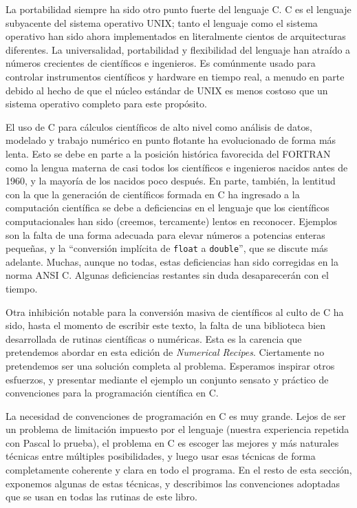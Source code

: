 \documentclass[10pt,a4paper]{book}
\begin{document}
\medskip

La portabilidad siempre ha sido otro punto fuerte del lenguaje C. C es el lenguaje subyacente del sistema operativo UNIX; tanto el lenguaje como el sistema operativo han sido ahora implementados en literalmente cientos de arquitecturas diferentes. La universalidad, portabilidad y flexibilidad del lenguaje han atraído a números crecientes de científicos e ingenieros. Es comúnmente usado para controlar instrumentos científicos y hardware en tiempo real, a menudo en parte debido al hecho de que el núcleo estándar de UNIX es menos costoso que un sistema operativo completo para este propósito.

\medskip

El uso de C para cálculos científicos de alto nivel como análisis de datos, modelado y trabajo numérico en punto flotante ha evolucionado de forma más lenta. Esto se debe en parte a la posición histórica favorecida del FORTRAN como la lengua materna de casi todos los científicos e ingenieros nacidos antes de 1960, y la mayoría de los nacidos poco después. En parte, también, la lentitud con la que la generación de científicos formada en C ha ingresado a la computación científica se debe a deficiencias en el lenguaje que los científicos computacionales han sido (creemos, tercamente) lentos en reconocer. Ejemplos son la falta de una forma adecuada para elevar números a potencias enteras pequeñas, y la “conversión implícita de \texttt{float} a \texttt{double}”, que se discute más adelante. Muchas, aunque no todas, estas deficiencias han sido corregidas en la norma ANSI C. Algunas deficiencias restantes sin duda desaparecerán con el tiempo.

\medskip

Otra inhibición notable para la conversión masiva de científicos al culto de C ha sido, hasta el momento de escribir este texto, la falta de una biblioteca bien desarrollada de rutinas científicas o numéricas. Esta es la carencia que pretendemos abordar en esta edición de \textit{Numerical Recipes}. Ciertamente no pretendemos ser una solución completa al problema. Esperamos inspirar otros esfuerzos, y presentar mediante el ejemplo un conjunto sensato y práctico de convenciones para la programación científica en C.

\medskip

La necesidad de convenciones de programación en C es muy grande. Lejos de ser un problema de limitación impuesto por el lenguaje (nuestra experiencia repetida con Pascal lo prueba), el problema en C es escoger las mejores y más naturales técnicas entre múltiples posibilidades, y luego usar esas técnicas de forma completamente coherente y clara en todo el programa. En el resto de esta sección, exponemos algunas de estas técnicas, y describimos las convenciones adoptadas que se usan en todas las rutinas de este libro.
\end{document}
